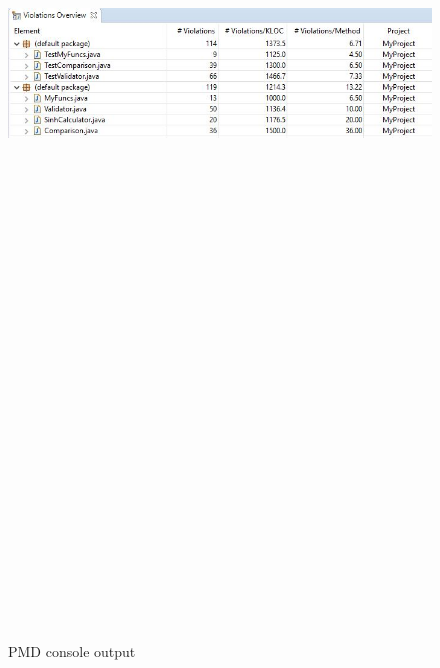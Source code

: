 \documentclass{article}
\begin{document}
 \begin{figure}[h!]
  \centering
 \includegraphics[width=16cm,height=30cm,keepaspectratio]{pmd1.jpg}\\[1cm] 
  \caption{PMD console output}
\end{figure}
\end{document}
